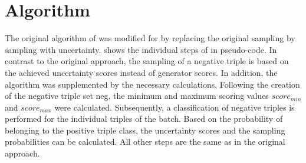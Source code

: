 \section{Algorithm}
\label{sec:algorithm}
The original algorithm of \kbgan was modified for \usgan by replacing the original sampling by sampling with uncertainty.
 shows the individual steps of \usgan in pseudo-code.
In contrast to the original \kbgan approach, the sampling of a negative triple is based on the achieved uncertainty scores instead of generator scores.
In addition, the algorithm was supplemented by the necessary calculations.
Following the creation of the negative triple set neg, the minimum and maximum scoring values $score_{min}$ and $score_{max}$ were calculated.
Subsequently, a classification of negative triples is performed for the individual triples of the batch.
Based on the probability of belonging to the positive triple class, the uncertainty scores and the sampling probabilities can be calculated.
All other steps are the same as in the original \kbgan approach.



